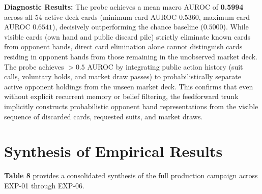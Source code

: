 \documentclass[11pt]{article}
\begin{document}
\noindent\textbf{Diagnostic Results:} The probe achieves a mean macro AUROC of \textbf{0.5994} across all 54 active deck cards (minimum card AUROC $0.5360$, maximum card AUROC $0.6541$), decisively outperforming the chance baseline ($0.5000$). While visible cards (own hand and public discard pile) strictly eliminate known cards from opponent hands, direct card elimination alone cannot distinguish cards residing in opponent hands from those remaining in the unobserved market deck. The probe achieves $> 0.5$ AUROC by integrating public action history (suit calls, voluntary holds, and market draw passes) to probabilistically separate active opponent holdings from the unseen market deck. This confirms that even without explicit recurrent memory or belief filtering, the feedforward trunk implicitly constructs probabilistic opponent hand representations from the visible sequence of discarded cards, requested suits, and market draws.

\section{Synthesis of Empirical Results}

\textbf{Table 8} provides a consolidated synthesis of the full production campaign across EXP-01 through EXP-06.
\end{document}
